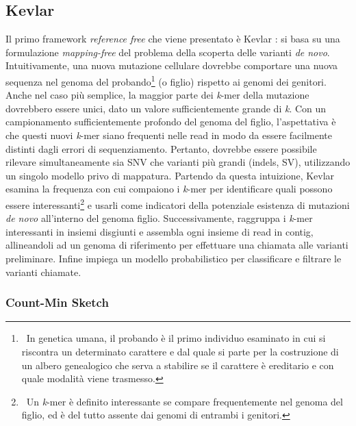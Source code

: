 \documentclass[../main.tex]{subfiles}
\begin{document}
\subsection{Kevlar}
\label{kevlar}

Il primo framework \textit{reference free} che viene presentato è Kevlar \cite{standage2019kevlar}: si basa su una formulazione \textit{mapping-free} del problema della scoperta delle varianti \textit{de novo}. Intuitivamente, una nuova mutazione cellulare dovrebbe comportare una nuova sequenza nel genoma del probando\footnote{\ In genetica umana, il probando è il primo individuo esaminato in cui si riscontra un determinato carattere e dal quale si parte per la costruzione di un albero genealogico che serva a stabilire se il carattere è ereditario e con quale modalità viene trasmesso.} (o figlio) rispetto ai genomi dei genitori. Anche nel caso più semplice, la maggior parte dei \textit{k}-mer della mutazione dovrebbero essere unici, dato un valore sufficientemente grande di \textit{k}. Con un campionamento sufficientemente profondo del genoma del figlio, l'aspettativa è che questi nuovi \textit{k}-mer siano frequenti nelle read in modo da essere facilmente distinti dagli errori di sequenziamento. Pertanto, dovrebbe essere possibile rilevare simultaneamente sia SNV che varianti più grandi (indels, SV), utilizzando un singolo modello privo di mappatura.
\noindent
Partendo da questa intuizione, Kevlar esamina la frequenza con cui compaiono i \textit{k}-mer per identificare quali possono essere interessanti\footnote{\ Un \textit{k}-mer è definito interessante se compare frequentemente nel genoma del figlio, ed è del tutto assente dai genomi di entrambi i genitori.} e usarli come indicatori della potenziale esistenza di mutazioni \textit{de novo} all'interno del genoma figlio. Successivamente, raggruppa i \textit{k}-mer interessanti in insiemi disgiunti e assembla ogni insieme di read in contig, allineandoli ad un genoma di riferimento per effettuare una chiamata alle varianti preliminare. Infine impiega un modello probabilistico per classificare e filtrare le varianti chiamate.

\subsubsection{Count-Min Sketch}
\label{count-min}
\end{document}
